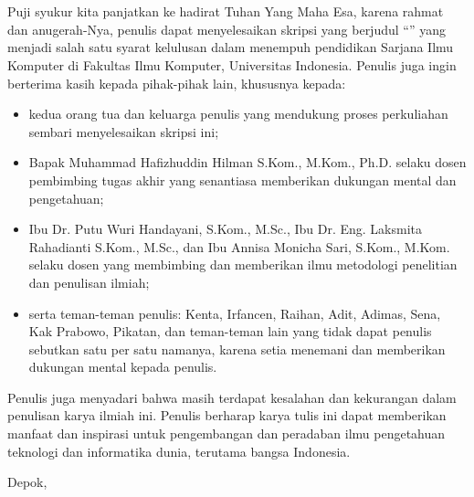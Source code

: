 \chapter*{\kataPengantar}
\pagestyle{first-pages}

Puji syukur kita panjatkan ke hadirat Tuhan Yang Maha Esa, karena rahmat dan anugerah-Nya, penulis dapat menyelesaikan skripsi yang berjudul “\judul” yang menjadi salah satu syarat kelulusan dalam menempuh pendidikan Sarjana Ilmu Komputer di  Fakultas Ilmu Komputer, Universitas Indonesia. Penulis juga ingin berterima kasih kepada pihak-pihak lain, khususnya kepada:

\begin{itemize}
    \setlength\itemsep{-0.5em}
    \item kedua orang tua dan keluarga penulis yang mendukung proses perkuliahan sembari menyelesaikan skripsi ini;
    \item Bapak Muhammad Hafizhuddin Hilman S.Kom., M.Kom., Ph.D. selaku dosen pembimbing tugas akhir yang senantiasa memberikan dukungan mental dan pengetahuan;
    \item Ibu Dr. Putu Wuri Handayani, S.Kom., M.Sc., Ibu Dr. Eng. Laksmita Rahadianti S.Kom., M.Sc., dan Ibu Annisa Monicha Sari, S.Kom., M.Kom. selaku dosen yang membimbing dan memberikan ilmu metodologi penelitian dan penulisan ilmiah;
    \item serta teman-teman penulis: Kenta, Irfancen, Raihan, Adit, Adimas, Sena, Kak Prabowo, Pikatan, dan teman-teman lain yang tidak dapat penulis sebutkan satu per satu namanya, karena setia menemani dan memberikan dukungan mental kepada penulis.
\end{itemize}

Penulis juga menyadari bahwa masih terdapat kesalahan dan kekurangan dalam penulisan karya ilmiah ini. Penulis berharap karya tulis ini dapat memberikan manfaat dan inspirasi untuk pengembangan dan peradaban ilmu pengetahuan teknologi dan informatika dunia, terutama bangsa Indonesia.

\vspace*{0.1cm}
\begin{flushright}
Depok, \tanggalSiapSidang\\[0.1cm]
\vspace*{1.5cm}
\penulis

\end{flushright}
